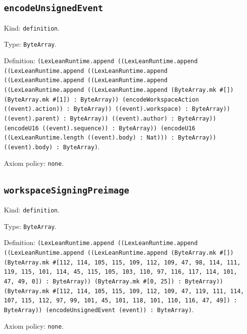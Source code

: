 \documentclass[11pt]{article}
\begin{document}
\subsection*{\texttt{encodeUnsignedEvent}}
\noindent Kind: \texttt{definition}.\par
\noindent Type: \texttt{ByteArray}.\par
\noindent Definition: \texttt{(LexLeanRuntime.append ((LexLeanRuntime.append ((LexLeanRuntime.append ((LexLeanRuntime.append ((LexLeanRuntime.append ((LexLeanRuntime.append ((LexLeanRuntime.append ((LexLeanRuntime.append (ByteArray.mk \#[]) (ByteArray.mk \#[1]) : ByteArray)) (encodeWorkspaceAction ((event).action)) : ByteArray)) ((event).workspace) : ByteArray)) ((event).parent) : ByteArray)) ((event).author) : ByteArray)) (encodeU16 ((event).sequence)) : ByteArray)) (encodeU16 ((LexLeanRuntime.length ((event).body) : Nat))) : ByteArray)) ((event).body) : ByteArray)}.\par
\noindent Axiom policy: \texttt{none}.\par
\subsection*{\texttt{workspaceSigningPreimage}}
\noindent Kind: \texttt{definition}.\par
\noindent Type: \texttt{ByteArray}.\par
\noindent Definition: \texttt{(LexLeanRuntime.append ((LexLeanRuntime.append ((LexLeanRuntime.append ((LexLeanRuntime.append (ByteArray.mk \#[]) (ByteArray.mk \#[112, 114, 105, 115, 109, 112, 109, 47, 98, 114, 111, 119, 115, 101, 114, 45, 115, 105, 103, 110, 97, 116, 117, 114, 101, 47, 49, 0]) : ByteArray)) (ByteArray.mk \#[0, 25]) : ByteArray)) (ByteArray.mk \#[112, 114, 105, 115, 109, 112, 109, 47, 119, 111, 114, 107, 115, 112, 97, 99, 101, 45, 101, 118, 101, 110, 116, 47, 49]) : ByteArray)) (encodeUnsignedEvent (event)) : ByteArray)}.\par
\noindent Axiom policy: \texttt{none}.\par
\end{document}
